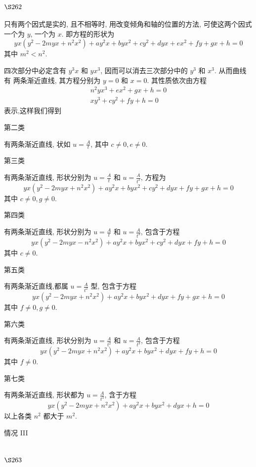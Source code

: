 \section{$\S 262$}

只有两个因式是实的, 且不相等时, 用改变倾角和轴的位置的方法, 可使这两个因式 一个为 $y$, 一个为 $x$. 即方程的形状为
\[
y x\left(y^{2}-2 m y x+n^{2} x^{2}\right)+a y^{2} x+b y x^{2}+c y^{2}+d y x+e x^{2}+f y+g x+h=0
\]
其中 $m^{2}<n^{2}$.

四次部分中必定含有 $y^{3} x$ 和 $y x^{3}$, 因而可以消去三次部分中的 $y^{3}$ 和 $x^{3}$. 从而曲线有 两条渐近直线, 其方程分别为 $y=0$ 和 $x=0$. 其性质依次由方程
\[
\begin{gathered}
n^{2} y x^{3}+e x^{2}+g x+h=0 \\
x y^{3}+c y^{2}+f y+h=0
\end{gathered}
\]
表示,这样我们得到

第二类

有两条渐近直线, 状如 $u=\frac{A}{t}$, 其中 $c \neq 0, e \neq 0$.

第三类

有两条渐近直线, 形状分别为 $u=\frac{A}{t}$ 和 $u=\frac{A}{t^{2}}$, 方程为
\[
y x\left(y^{2}-2 m y x+n^{2} x^{2}\right)+a y^{2} x+b y x^{2}+c y^{2}+d y x+f y+g x+h=0
\]
其中 $c \neq 0, g \neq 0$.

第四类

有两条渐近直线, 形状分别为 $u=\frac{A}{t}$ 和 $u=\frac{A}{t^{3}}$, 包含于方程
\[
y x\left(y^{2}-2 m y x-n^{2} x^{2}\right)+a y^{2} x+b y x^{2}+c y^{2}+d y x+f y+h=0
\]
其中 $c \neq 0$.

第五类

有两条渐近直线,都属 $u=\frac{A}{t^{2}}$ 型, 包含于方程
\[
y x\left(y^{2}-2 m y x+n^{2} x^{2}\right)+a y^{2} x+b y x^{2}+d y x+f y+g x+h=0
\]
其中 $f \neq 0, g \neq 0$.

第六类

有两条渐近直线, 形状分别为 $u=\frac{A}{t^{2}}$ 和 $u=\frac{A}{t^{3}}$, 包含于方程
\[
y x\left(y^{2}-2 m y x+n^{2} x^{2}\right)+a y^{2} x+b y x^{2}+d y x+f y+h=0
\]
其中 $f \neq 0$. 

第七类

有两条渐近直线, 形状都为 $u=\frac{A}{t^{3}}$, 含于方程
\[
y x\left(y^{2}-2 m y x+n^{2} x^{2}\right)+a y^{2} x+b y x^{2}+d y x+h=0
\]
以上各类 $n^{2}$ 都大于 $m^{2}$.

情况 III

\section{$\S 263$}


